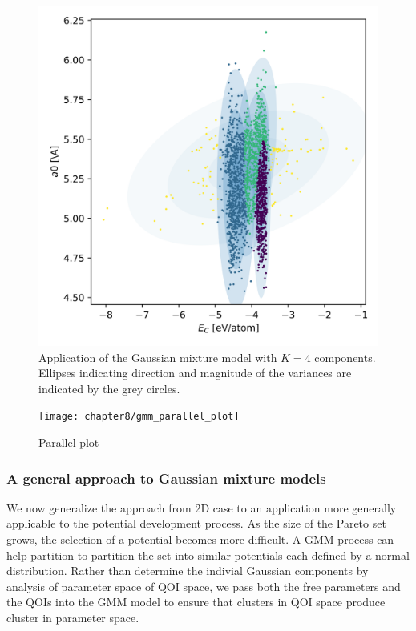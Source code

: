 \begin{figure}[ht]
	\centering
	\includegraphics[width=5in]{chapter8/Si_Ec_a0_gmm}
	\caption{Application of the Gaussian mixture model with $K=4$ components.  Ellipses indicating direction and magnitude of the variances are indicated by the grey circles.}
	\label{fig:Si_Ec_a0_gmm}
\end{figure}

\begin{figure}[hbt]
	\centering
	\captionsetup{justification=centering,margin=1in}
	\texttt{[image: chapter8/gmm\_parallel\_plot]}
	\caption{Parallel plot}
	\label{fig:Si_gmm_parallel_plot_2_qoi}
\end{figure}

\subsubsection{A general approach to Gaussian mixture models}

We now generalize the approach from 2D case to an application more generally applicable to the potential development process.  As the size of the Pareto set grows, the selection of a potential becomes more difficult.  A GMM process can help partition to partition the set into similar potentials each defined by a normal distribution.  Rather than determine the indivial Gaussian components by analysis of parameter space of QOI space, we pass both the free parameters and the QOIs into the GMM model to ensure that clusters in QOI space produce cluster in parameter space.

